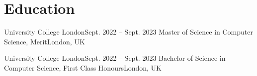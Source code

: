 \section{Education}
\resumeSubHeadingListStart

\resumeSubheading
{University College London}{Sept. 2022 -- Sept. 2023}
{Master of Science in Computer Science, Merit}{London, UK}
\resumeItemListStart
{}
\resumeItemListEnd

\resumeSubheading
{University College London}{Sept. 2022 -- Sept. 2023}
{Bachelor of Science in Computer Science, First Class Honours}{London, UK}

\resumeSubHeadingListEnd
\vspace{-16pt}